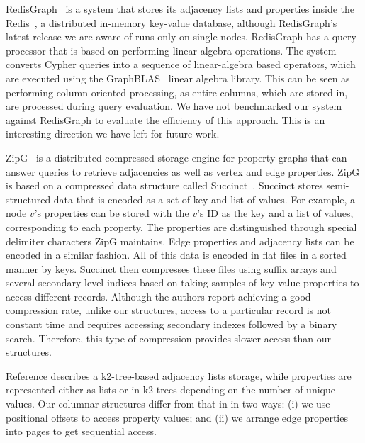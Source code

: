 RedisGraph~\cite{redisgraph} is a system that stores its adjacency lists and properties inside the Redis~\cite{redis}, a distributed in-memory key-value database, although RedisGraph's latest release we are aware of runs only on single nodes. RedisGraph has a query processor that is based on performing linear algebra operations. The system converts Cypher queries into a sequence of linear-algebra based operators, which are executed using the GraphBLAS~\cite{graphblas} linear algebra library. This can be seen as performing column-oriented processing, as entire columns, which are stored in, are processed during query evaluation. We have not benchmarked our system against RedisGraph to evaluate the efficiency of this approach. This is an interesting direction we have left for future work.

ZipG~\cite{zipg} is a distributed compressed storage engine for property graphs that can answer queries to retrieve adjacencies as well as vertex and edge properties. ZipG is based on a compressed data structure called Succinct~\cite{succinct}. Succinct stores semi-structured data that is encoded as a set of key and list of values. For example, a node $v$'s properties can be stored with the $v$'s ID as the key and a list of values, corresponding to each property. The properties are distinguished through special delimiter characters ZipG maintains. Edge properties and adjacency lists can be encoded in a similar fashion. All of this data is encoded in flat files in a sorted manner by keys. Succinct then compresses these files using suffix arrays and several secondary level indices based on taking samples of key-value properties to access different records. Although the authors report achieving a good compression rate, unlike our structures, access to a particular record is not constant time and requires accessing secondary indexes followed by a binary search. Therefore, this type of compression provides slower access than our structures. 

Reference \cite{compact-rep-graph} describes a k2-tree-based adjacency lists storage, while properties are represented either as lists or in k2-trees depending on the number of unique values. Our columnar structures differ from that in \cite{compact-rep-graph} in two ways: (i) we use positional offsets to access property values; and (ii) we arrange edge properties into pages to get sequential access.

